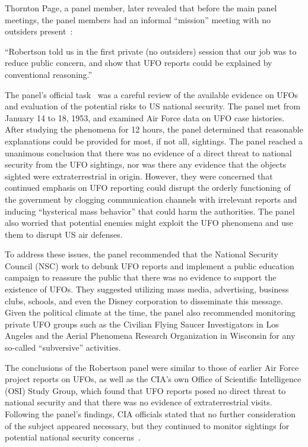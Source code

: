 Thornton Page, a panel member, later revealed that before the main panel meetings, the panel members had an informal ``mission'' meeting with no outsiders present~\cite{Page1992}:
\begin{svgraybox}
``Robertson told us in the first private (no outsiders) session that our job was to reduce public concern,
and show that UFO reports could be explained by conventional reasoning.''
\end{svgraybox}

The panel's official task~\cite{Haines-CIA-UFO} was a careful review of the available evidence on UFOs and evaluation of the potential risks to US national security.
The panel met from January 14 to 18, 1953, and examined Air Force data on UFO case histories.
After studying the phenomena for 12 hours, the panel determined that reasonable explanations could be provided for most,
if not all, sightings.
The panel reached a unanimous conclusion that there was no evidence of a direct threat to national security from the UFO sightings,
nor was there any evidence that the objects sighted were extraterrestrial in origin. However, they were concerned that continued emphasis on UFO reporting could disrupt the orderly functioning of the government by clogging communication channels with irrelevant reports and inducing ``hysterical mass behavior'' that could harm the authorities.
The panel also worried that potential enemies might exploit the UFO phenomena and use them to disrupt US air defenses.

To address these issues, the panel recommended that the National Security Council (NSC) work to debunk UFO reports
and implement a public education campaign to reassure the public that there was no evidence to support the existence of UFOs.
They suggested utilizing mass media, advertising, business clubs, schools, and even the Disney corporation to disseminate this message.
Given the political climate at the time, the panel also recommended monitoring
private UFO groups such as the Civilian Flying Saucer Investigators in Los Angeles and the
Aerial Phenomena Research Organization in Wisconsin for any so-called ``subversive'' activities.

The conclusions of the Robertson panel were similar to those of earlier Air Force project reports on UFOs,
as well as the CIA's own Office of Scientific Intelligence (OSI) Study Group, which found that UFO reports posed no direct threat to national security
and that there was no evidence of extraterrestrial visits.
Following the panel's findings, CIA officials stated that no further consideration of the subject appeared necessary,
but they continued to monitor sightings for potential national security concerns~\cite{RobertsonPanelDurantReport}.

